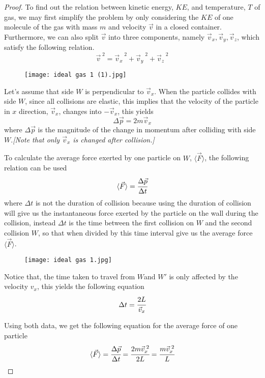 \documentclass{article}
\begin{document}
\begin{proof}

To find out the relation between kinetic energy, $KE$,  and temperature, $T$ of gas, we may first simplify the problem by only considering the $KE$ of one molecule of the gas with mass $m$ and velocity $\vec{v}$ in a closed container. Furthermore, we can also split $\vec{v}$ into three components, namely $\vec{v}_x, \vec{v}_y, \vec{v}_z$, which satisfy the following relation.
\begin{equation}
{\vec{v}}^{\; 2}={\vec{v}_x}^{\; 2}+{\vec{v}_y}^{\; 2}+{\vec{v}_z}^{\; 2}
\end{equation}
\begin{figure}[H]
    \centering
    \texttt{[image: ideal gas 1 (1).jpg]}
\end{figure}
Let's assume that side $W$ is perpendicular to $\vec{v}_x$. When the particle collides with side $W$, since all collisions are elastic, this implies that the velocity of the particle in $x$ direction, $\vec{v}_x$, changes into $-\vec{v}_x$, this yields
$$\Delta \vec{p}=2m\vec{v}_x$$
    where $\Delta \vec{p}$ is the magnitude of the change in momentum after colliding with side $W$.\textit{[Note that only $\vec{v}_x$ is changed after collision.]}

To calculate the average force exerted by one particle on $W$, $\langle\vec{F}\rangle$, the following relation can be used
    $$\langle \vec{F} \rangle= \cfrac{\Delta \vec{p}}{\Delta t}$$
where $\Delta t$ is not the duration of collision because using the duration of collision will give us the instantaneous force exerted by the particle on the wall during the collision, instead $\Delta t$ is the time between the first collision on $W$ and the second collision $W$, so that when divided by this time interval give us the average force $\langle \vec{F} \rangle$.

\begin{figure}[H]
    \centering
    \texttt{[image: ideal gas 1.jpg]}
\end{figure}
Notice that, the time taken to travel from $W$and $W'$ is only affected by the velocity $v_x$, this yields the following equation
$$\Delta t=\cfrac{2L}{\vec{v}_x}$$

Using both data, we get the following equation for the average force of one particle
$$\langle \vec{F} \rangle=\cfrac{\Delta \vec{p}}{\Delta t}=\cfrac{2m\vec{v}_x^{\; 2}}{2L}=\cfrac{m\vec{v}_x^{\; 2}}{L}$$


\end{proof}
\end{document}
